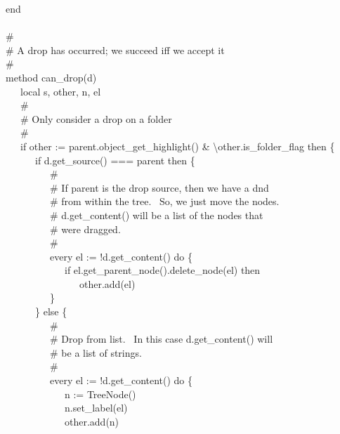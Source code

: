 {\>   end \\
\ \\
\>   \# \\
\>   \# A drop has occurred; we succeed iff we accept it \\
\>   \# \\
\>   method can\_drop(d) \\
\>   \ \ \ local s, other, n, el \\
\>   \ \ \ \# \\
\>   \ \ \ \# Only consider a drop on a folder \\
\>   \ \ \ \# \\
\>   \ \ \ if other := parent.object\_get\_highlight() \&
{\textbackslash}other.is\_folder\_flag then \{ \\
\>   \ \ \ \ \ \ if d.get\_source() === parent then \{ \\
\>   \ \ \ \ \ \ \ \ \ \# \\
\>   \ \ \ \ \ \ \ \ \ \# If parent is the drop source, then we have a
dnd \\
\>   \ \ \ \ \ \ \ \ \ \# from within the tree. \ So, we just move the
nodes. \\
\>   \ \ \ \ \ \ \ \ \ \# d.get\_content() will be a list of the nodes
that \\
\>   \ \ \ \ \ \ \ \ \ \# were dragged. \\
\>   \ \ \ \ \ \ \ \ \ \# \\
\>   \ \ \ \ \ \ \ \ \ every el := !d.get\_content() do \{ \\
\>   \ \ \ \ \ \ \ \ \ \ \ \ if el.get\_parent\_node().delete\_node(el)
then \\
\>   \ \ \ \ \ \ \ \ \ \ \ \ \ \ \ other.add(el) \\
\>   \ \ \ \ \ \ \ \ \ \} \\
\>   \ \ \ \ \ \ \} else \{ \\
\>   \ \ \ \ \ \ \ \ \ \# \\
\>   \ \ \ \ \ \ \ \ \ \# Drop from list. \ In this case
d.get\_content() will \\
\>   \ \ \ \ \ \ \ \ \ \# be a list of strings. \\
\>   \ \ \ \ \ \ \ \ \ \# \\
\>   \ \ \ \ \ \ \ \ \ every el := !d.get\_content() do \{ \\
\>   \ \ \ \ \ \ \ \ \ \ \ \ n := TreeNode() \\
\>   \ \ \ \ \ \ \ \ \ \ \ \ n.set\_label(el) \\
\>   \ \ \ \ \ \ \ \ \ \ \ \ other.add(n) \\
}
